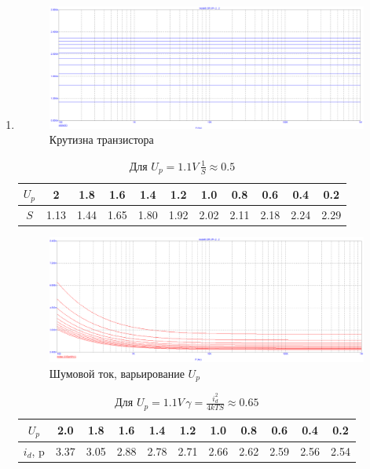 \documentclass[a4paper, 12pt]{article}%
\begin{document}
\begin{enumerate}

\item

\FloatBarrier
\begin{figure}[h!]
    \centering
    \includegraphics[scale=0.3]{images/mod6_1_1.png}
    \caption{Крутизна транзистора}
    \label{fig:m611}
\end{figure}

\begin{center}
\begin{table}[h!]
    \centering
    \begin{tabular}{|c|c|c|c|c|c|c|c|c|c|c|}
    \hline
        $U_p$ & 2 & 1.8 & 1.6 & 1.4 & 1.2 & 1.0 & 0.8 & 0.6 & 0.4 & 0.2\\ \hline
        $S$ & 1.13 & 1.44 & 1.65 & 1.80 & 1.92 & 2.02 & 2.11 & 2.18 & 2.24 & 2.29 \\ \hline
    \end{tabular}
    \caption{Для $U_p = 1.1 V \, \frac{1}{S} \approx 0.5$}
    \label{tab:my_label}
\end{table}
\end{center}

\begin{figure}[h!]
    \centering
    \includegraphics[scale=0.225]{images/mod6_1_2.png}
    \caption{Шумовой ток, варьирование $U_p$}
    \label{fig:m612}
\end{figure}

\begin{center}
\begin{table}[h!]
    \centering
    \begin{tabular}{|c|c|c|c|c|c|c|c|c|c|c|}
    \hline
        $U_p$ & 2.0 & 1.8 & 1.6 & 1.4 & 1.2 & 1.0 & 0.8 & 0.6 & 0.4 & 0.2\\ \hline
        $i_d$, p & 3.37 & 3.05 & 2.88 & 2.78 & 2.71 & 2.66 & 2.62 & 2.59 & 2.56 & 2.54 \\ \hline
    \end{tabular}
    \caption{Для $U_p = 1.1 V\, \gamma = \frac{i_d^2}{4kTS} \approx 0.65$}
    \label{tab:mt612}
\end{table}
\end{center}


\end{enumerate}
\end{document}
